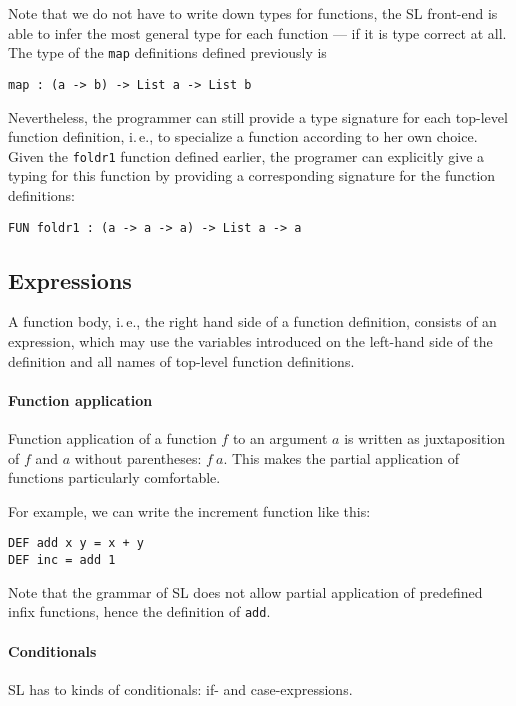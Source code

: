 \documentclass{article}
\begin{document}
Note that we do not have to write down types for functions, the SL
front-end is able to infer the most general type for each function ---
if it is type correct at all. The type of the \verb|map| definitions
defined previously is
\begin{verbatim}
map : (a -> b) -> List a -> List b
\end{verbatim}
Nevertheless, the programmer can still provide a type signature for
each top-level function definition, i.\,e., to specialize a function
according to her own choice. Given the \verb|foldr1| function defined
earlier, the programer can explicitly give a typing for this function
by providing a corresponding signature for the function definitions:
\begin{verbatim}
FUN foldr1 : (a -> a -> a) -> List a -> a
\end{verbatim}


\subsection{Expressions}
\label{sec:expressions}

A function body, i.\,e., the right hand side of a function definition,
consists of an expression, which may use the variables introduced on
the left-hand side of the definition and all names of top-level
function definitions.


\paragraph{Function application}
\label{sec:function-application}

Function application of a function $f$ to an argument $a$ is written
as juxtaposition of $f$ and $a$ without parentheses: $f\ a$. This
makes the partial application of functions particularly comfortable.

For example, we can write the increment function like this:
\begin{verbatim}
DEF add x y = x + y
DEF inc = add 1
\end{verbatim}
Note that the grammar of SL does not allow partial application of
predefined infix functions, hence the definition of \verb|add|.


\paragraph{Conditionals}
\label{sec:conditionals}

SL has to kinds of conditionals: if- and case-expressions. 
\end{document}
